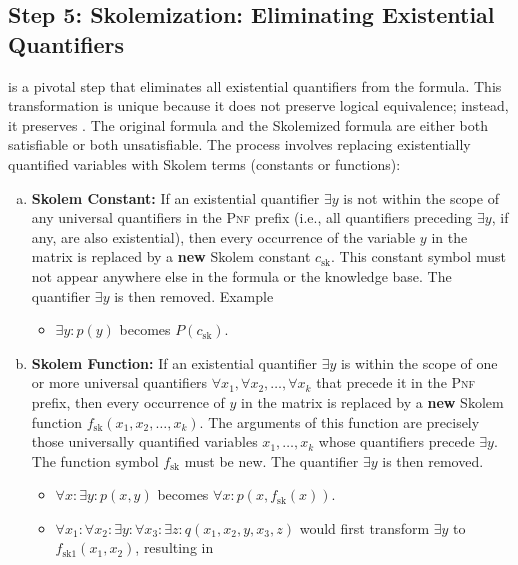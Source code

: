 \subsection{Step 5: Skolemization: Eliminating Existential Quantifiers}
 is a pivotal step that eliminates all existential quantifiers from the formula. This
transformation is unique because it does not preserve logical equivalence; instead, it preserves
 . The original formula and the Skolemized formula are
either both satisfiable or both unsatisfiable. 
The process involves replacing existentially quantified variables with Skolem terms (constants or functions):
\begin{enumerate}[(a)]
\item \textbf{Skolem Constant:} If an existential quantifier $\exists y$ is not within the scope of any
      universal quantifiers in the \textsc{Pnf} prefix (i.e., all quantifiers preceding $\exists y$, if any, are
      also existential), then every occurrence of the variable $y$ in the matrix is replaced by a \textbf{new}
      Skolem constant $c_{\mathrm{sk}}$. This constant symbol must not appear anywhere else in the formula or the
      knowledge base. The quantifier $\exists y$ is then removed.  Example
      \begin{itemize}
          \item $\exists y: p(y)$ becomes $P(c_{\mathrm{sk}})$.
      \end{itemize}
\item \textbf{Skolem Function:} If an existential quantifier $\exists y$ is within the scope of one or more
      universal quantifiers $\forall x_1, \forall x_2, \dots, \forall x_k$ that precede it in the \textsc{Pnf}
      prefix, then every occurrence of $y$ in the matrix is replaced by a \textbf{new} Skolem function
      $f_{\mathrm{sk}}(x_1, x_2, \dots, x_k)$. The arguments of this function are precisely those universally
      quantified variables $x_1, \dots, x_k$ whose quantifiers precede $\exists y$. The function symbol
      $f_{\mathrm{sk}}$ must be new. The quantifier $\exists y$ is then removed. 
      \begin{itemize}
        \item $\forall x: \exists y: p(x,y)$ becomes $\forall x: p(x, f_{\mathrm{sk}}(x))$.
        \item  $\forall x_1: \forall x_2: \exists y: \forall x_3: \exists z: q(x_1, x_2, y, x_3, z)$ would first
              transform $\exists y$ to $f_{\mathrm{sk1}}(x_1, x_2)$, resulting in

\end{itemize}
\end{enumerate}
